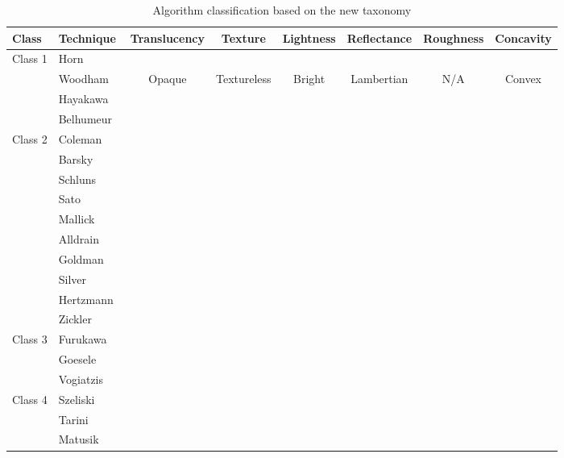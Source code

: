 \begin{landscape}
\centering
\begin{table}[h]
  \centering
  \begin{tabular}{*{2}{l}*{6}{c}}
  \hline
  \textbf{Class} & \textbf{Technique} & Translucency & Texture & Lightness & Reflectance & Roughness & Concavity\\
  \hline
  Class 1 & Horn~\cite{horn1989shape} \\
  & Woodham~\cite{woodham1980photometric} & Opaque & Textureless & Bright & Lambertian & N/A & Convex\\
  & Hayakawa~\cite{hayakawa1994photometric} \\
  & Belhumeur~\cite{belhumeur1999bas} \\
  \hline
  Class 2 & Coleman~\cite{coleman1982obtaining} \\
  & Barsky~\cite{barsky20034} \\
  & Schluns~\cite{schluns1993photometric} \\
  & Sato~\cite{sato1994temporal} \\
  & Mallick~\cite{mallick2005beyond} \\
  & Alldrain~\cite{alldrin2008photometric} \\
  & Goldman~\cite{goldman2010shape} \\
  & Silver~\cite{silver1980determining}\\
  & Hertzmann~\cite{hertzmann2005example} \\
  & Zickler~\cite{zickler2002helmholtz} \\
  \hline
  Class 3 & Furukawa~\cite{furukawa2010accurate} \\
  & Goesele~\cite{goesele2006multi} \\
  & Vogiatzis~\cite{vogiatzis2007multiview} \\
  \hline
  Class 4 & Szeliski~\cite{szeliski1993rapid} \\
  & Tarini~\cite{tarini2002marching} \\
  & Matusik~\cite{matusik2002efficient} \\
  \hline
  \end{tabular}
  \caption{Algorithm classification based on the new taxonomy}
  \label{tab:algo_taxo}
\end{table}
\end{landscape}
